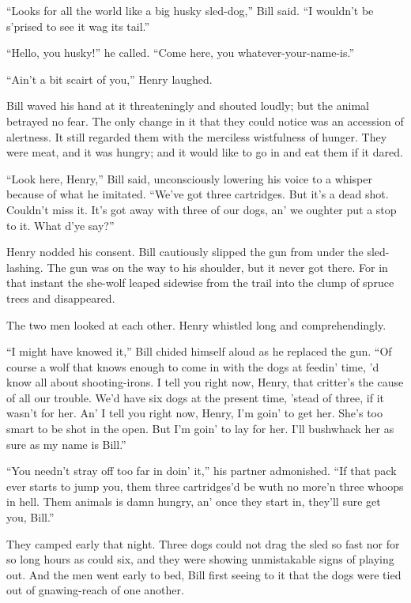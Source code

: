 “Looks for all the world like a big husky sled-dog,” Bill said. “I
wouldn’t be s’prised to see it wag its tail.”

“Hello, you husky!” he called. “Come here, you whatever-your-name-is.”

“Ain’t a bit scairt of you,” Henry laughed.

Bill waved his hand at it threateningly and shouted loudly; but the
animal betrayed no fear. The only change in it that they could notice
was an accession of alertness. It still regarded them with the
merciless wistfulness of hunger. They were meat, and it was hungry; and
it would like to go in and eat them if it dared.

“Look here, Henry,” Bill said, unconsciously lowering his voice to a
whisper because of what he imitated. “We’ve got three cartridges. But
it’s a dead shot. Couldn’t miss it. It’s got away with three of our
dogs, an’ we oughter put a stop to it. What d’ye say?”

Henry nodded his consent. Bill cautiously slipped the gun from under
the sled-lashing. The gun was on the way to his shoulder, but it never
got there. For in that instant the she-wolf leaped sidewise from the
trail into the clump of spruce trees and disappeared.

The two men looked at each other. Henry whistled long and
comprehendingly.

“I might have knowed it,” Bill chided himself aloud as he replaced the
gun. “Of course a wolf that knows enough to come in with the dogs at
feedin’ time, ’d know all about shooting-irons. I tell you right now,
Henry, that critter’s the cause of all our trouble. We’d have six dogs
at the present time, ’stead of three, if it wasn’t for her. An’ I tell
you right now, Henry, I’m goin’ to get her. She’s too smart to be shot
in the open. But I’m goin’ to lay for her. I’ll bushwhack her as sure
as my name is Bill.”

“You needn’t stray off too far in doin’ it,” his partner admonished.
“If that pack ever starts to jump you, them three cartridges’d be wuth
no more’n three whoops in hell. Them animals is damn hungry, an’ once
they start in, they’ll sure get you, Bill.”

They camped early that night. Three dogs could not drag the sled so
fast nor for so long hours as could six, and they were showing
unmistakable signs of playing out. And the men went early to bed, Bill
first seeing to it that the dogs were tied out of gnawing-reach of one
another.

